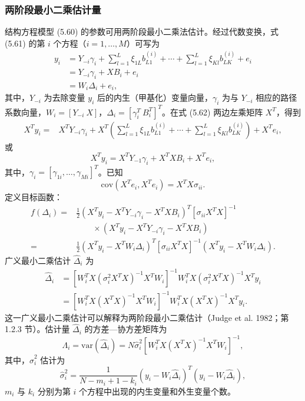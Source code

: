 \subsubsection{两阶段最小二乘估计量}

结构方程模型 (5.60) 的参数可用两阶段最小二乘法估计。经过代数变换，式 (5.61) 的第 $i$ 个方程（$i=1,\ldots,M$）可写为
\begin{equation}
\begin{aligned}
y_i&=Y_{-i}\gamma_i+\sum_{l=1}^L\xi_{1L}b_{L1}^{(i)}+\cdots
+\sum_{l=1}^L\xi_{Kl}b_{LK}^{(i)}+e_i\\
&=Y_{-i}\gamma_i+XB_i+e_i\\
&=W_i\Delta_i+e_i,
\end{aligned}
\tag{5.62}
\end{equation}
其中，$Y_{-i}$ 为去除变量 $y_i$ 后的内生（甲基化）变量向量，$\gamma_i$ 为与 $Y_{-i}$ 相应的路径系数向量，$W_i=[Y_{-i}\ X]$，$\Delta_i=[\gamma_i^T\ B_i^T]^T$。在式 (5.62) 两边左乘矩阵 $X^T$，得到
\[
\begin{aligned}
X^Ty_i={}&X^TY_{-i}\gamma_i
+X^T\left(\sum_{l=1}^L\xi_{1L}b_{L1}^{(i)}+\cdots
+\sum_{l=1}^L\xi_{Kl}b_{LK}^{(i)}\right)+X^Te_i,
\end{aligned}
\]
或
\begin{equation}
X^Ty_i=X^TY_{-1}\gamma_i+X^TXB_i+X^Te_i,
\tag{5.63}
\end{equation}
其中，$\gamma_i=[\gamma_{1i},\ldots,\gamma_{Mi}]^T$。已知
\[
\mathrm{cov}(X^Te_i,X^Te_i)=X^TX\sigma_{ii}.
\]
定义目标函数：
\begin{equation}
\begin{aligned}
f(\Delta_i)
={}&\frac12(X^Ty_i-X^TY_{-i}\gamma_i-X^TXB_i)^T[\sigma_{ii}X^TX]^{-1}\\
&\qquad\times(X^Ty_i-X^TY_{-i}\gamma_i-X^TXB_i)\\
={}&\frac12(X^Ty_i-X^TW_i\Delta_i)^T[\sigma_{ii}X^TX]^{-1}
(X^Ty_i-X^TW_i\Delta_i).
\end{aligned}
\tag{5.64}
\end{equation}
广义最小二乘估计 $\widehat\Delta_i$ 为
\begin{equation}
\begin{aligned}
\widehat\Delta_i
&=[W_i^TX(\sigma_i^2X^TX)^{-1}X^TW_i]^{-1}
W_i^TX(\sigma_i^2X^TX)^{-1}X^Ty_i\\
&=[W_i^TX(X^TX)^{-1}X^TW_i]^{-1}
W_i^TX(X^TX)^{-1}X^Ty_i.
\end{aligned}
\tag{5.65}
\end{equation}
这一广义最小二乘估计可以解释为两阶段最小二乘估计（Judge et al. 1982；第 1.2.3 节）。估计量 $\widehat\Delta_i$ 的方差—协方差矩阵为
\begin{equation}
\Lambda_i=\mathrm{var}(\widehat\Delta_i)
=N\widehat\sigma_i^2[W_i^TX(X^TX)^{-1}X^TW_i]^{-1},
\tag{5.66}
\end{equation}
其中，$\widehat\sigma_i^2$ 估计为
\begin{equation}
\widehat\sigma_i^2=\frac1{N-m_i+1-k_i}
(y_i-W_i\widehat\Delta_i)^T(y_i-W_i\widehat\Delta_i),
\tag{5.67}
\end{equation}
$m_i$ 与 $k_i$ 分别为第 $i$ 个方程中出现的内生变量和外生变量个数。

